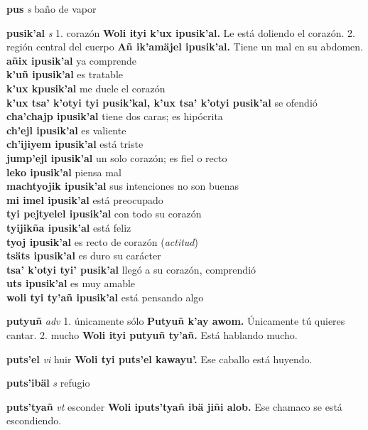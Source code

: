\documentclass[10pt]{scrbook}
\newcommand{\entry}[1]{\textbf{#1}}
\newcommand{\onedefinition}[1]{#1.}
\newcommand{\partofspeech}[1]{\textit{#1}}
\newcommand{\spanishtranslation}[1]{#1}
\newcommand{\clarification}[1]{(\textit{#1})}
\newcommand{\cholexample}[1]{\textbf{#1}}
\newcommand{\exampletranslation}[1]{#1}
\newcommand{\secondaryentry}[1]{\\\textbf{#1}}
\newcommand{\secondtranslation}[1]{#1}
\begin{document}
\begin{multicols}{2}
\entry{pus}
\partofspeech{s}
\spanishtranslation{baño de vapor}

\entry{pusik'al}
\partofspeech{s}
\onedefinition{1}
\spanishtranslation{corazón}
\cholexample{Woli ityi k'ux ipusik'al.}
\exampletranslation{Le está doliendo el corazón.}
\onedefinition{2}
\spanishtranslation{región central del cuerpo}
\cholexample{Añ ik'amäjel ipusik'al.}
\exampletranslation{Tiene un mal en su abdomen.}
\secondaryentry{añix ipusik'al}
\secondtranslation{ya comprende}
\secondaryentry{k'uñ ipusik'al}
\secondtranslation{es tratable}
\secondaryentry{k'ux kpusik'al}
\secondtranslation{me duele el corazón}
\secondaryentry{k'ux tsa' k'otyi tyi pusik'kal, k'ux tsa' k'otyi pusik'al}
\secondtranslation{se ofendió}
\secondaryentry{cha'chajp ipusik'al}
\secondtranslation{tiene dos caras; es hipócrita}
\secondaryentry{ch'ejl ipusik'al}
\secondtranslation{es valiente}
\secondaryentry{ch'ijiyem ipusik'al}
\secondtranslation{está triste}
\secondaryentry{jump'ejl ipusik'al}
\secondtranslation{un solo corazón; es fiel o recto}
\secondaryentry{leko ipusik'al}
\secondtranslation{piensa mal}
\secondaryentry{machtyojik ipusik'al}
\secondtranslation{sus intenciones no son buenas}
\secondaryentry{mi imel ipusik'al}
\secondtranslation{está preocupado}
\secondaryentry{tyi pejtyelel ipusik'al}
\secondtranslation{con todo su corazón}
\secondaryentry{tyijikña ipusik'al}
\secondtranslation{está feliz}
\secondaryentry{tyoj ipusik'al}
\secondtranslation{es recto de corazón}
\clarification{actitud}
\secondaryentry{tsäts ipusik'al}
\secondtranslation{es duro su carácter}
\secondaryentry{tsa' k'otyi tyi' pusik'al}
\secondtranslation{llegó a su corazón, comprendió}
\secondaryentry{uts ipusik'al}
\secondtranslation{es muy amable}
\secondaryentry{woli tyi ty'añ ipusik'al}
\secondtranslation{está pensando algo}

\entry{putyuñ}
\partofspeech{adv}
\onedefinition{1}
\spanishtranslation{únicamente}
\spanishtranslation{sólo}
\cholexample{Putyuñ k'ay awom.}
\exampletranslation{Únicamente tú quieres cantar.}
\onedefinition{2}
\spanishtranslation{mucho}
\cholexample{Woli ityi putyuñ ty'añ.}
\exampletranslation{Está hablando mucho.}

\entry{puts'el}
\partofspeech{vi}
\spanishtranslation{huir}
\cholexample{Woli tyi puts'el kawayu'.}
\exampletranslation{Ese caballo está huyendo.}

\entry{puts'ibäl}
\partofspeech{s}
\spanishtranslation{refugio}

\entry{puts'tyañ}
\partofspeech{vt}
\spanishtranslation{esconder}
\cholexample{Woli iputs'tyañ ibä jiñi alob.}
\exampletranslation{Ese chamaco se está escondiendo.}


\end{multicols}
\end{document}
